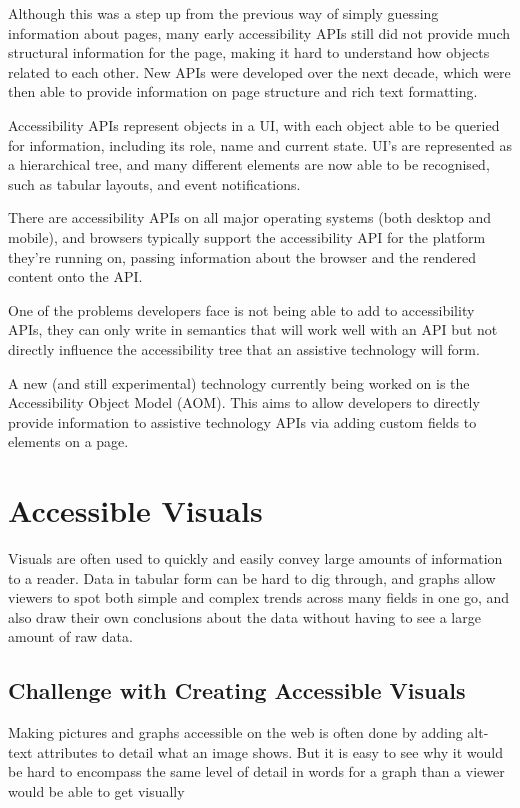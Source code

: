 \documentclass[ %
                    author={Aleena Baig},
                supervisor={Dr Simon Lock},
                    degree={BSc},
                     title={On Making Web Accessible Graphs},
                  subtitle={},
                      year={2019} ]{dissertation}
\begin{document}
Although this was a step up from the previous way of simply guessing information about pages, many early accessibility APIs still did not provide much structural information for the page, making it hard to understand how objects related to each other. New APIs were developed over the next decade, which were then able to provide information on page structure and rich text formatting.

Accessibility APIs represent objects in a UI, with each object able to be queried for information, including its role, name and current state. UI's are represented as a hierarchical tree, and many different elements are now able to be recognised, such as tabular layouts, and event notifications.

There are accessibility APIs on all major operating systems (both desktop and mobile), and browsers typically support the accessibility API for the platform they're running on, passing information about the browser and the rendered content onto the API.

One of the problems developers face is not being able to add to accessibility APIs, they can only write in semantics that will work well with an API but not directly influence the accessibility tree that an assistive technology will form.

A new (and still experimental) technology currently being worked on is the Accessibility Object Model (AOM). This aims to allow developers to directly provide information to assistive technology APIs via adding custom fields to elements on a page.

\section{Accessible Visuals}

Visuals are often used to quickly and easily convey large amounts of information to a reader. Data in tabular form can be hard to dig through, and graphs allow viewers to spot both simple and complex trends across many fields in one go, and also draw their own conclusions about the data without having to see a large amount of raw data.


\subsection{Challenge with Creating Accessible Visuals}

Making pictures and graphs accessible on the web is often done by adding alt-text attributes to detail what an image shows. But it is easy to see why it would be hard to encompass the same level of detail in words for a graph than a viewer would be able to get visually
\end{document}
